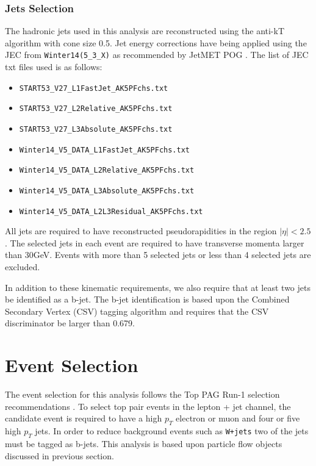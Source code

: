 \subsubsection*{Jets Selection}
The hadronic jets used in this analysis are reconstructed using the anti-kT algorithm with cone size 0.5. Jet energy corrections have being applied using the JEC from \texttt{Winter14(5\_3\_X)} as recommended by JetMET POG \cite{JEC_intro}\cite{JEC_paper}. The list of JEC txt files used is as follows:
\begin{itemize}
\item \texttt{START53\_V27\_L1FastJet\_AK5PFchs.txt}
\item \texttt{START53\_V27\_L2Relative\_AK5PFchs.txt}
\item \texttt{START53\_V27\_L3Absolute\_AK5PFchs.txt}
\item \texttt{Winter14\_V5\_DATA\_L1FastJet\_AK5PFchs.txt}
\item \texttt{Winter14\_V5\_DATA\_L2Relative\_AK5PFchs.txt}
\item \texttt{Winter14\_V5\_DATA\_L3Absolute\_AK5PFchs.txt}
\item \texttt{Winter14\_V5\_DATA\_L2L3Residual\_AK5PFchs.txt}
\end{itemize}  

All jets are required to have reconstructed pseudorapidities in the region $|\eta|<2.5$.  The selected jets in each event are required to have transverse momenta larger than 30GeV. Events with more than 5 selected jets or less than 4 selected jets are excluded. 

In addition to these kinematic requirements, we also require that at least two jets be identified as a b-jet.  The b-jet identification is based upon the Combined Secondary Vertex (CSV) tagging algorithm \cite{CSV_note} and requires that the CSV discriminator be larger than 0.679.

\section{Event Selection}
\label{sec:event_selection}

The event selection for this analysis follows the Top PAG Run-1 selection recommendations \cite{top_selection}.  To select top pair events in the lepton + jet channel, the candidate event is required to have a high $p_T$ electron or muon and four or five high $p_T$ jets.  In order to reduce background events such as \texttt{W+jets} two of the jets must be tagged as b-jets.   This analysis is based upon particle flow objects discussed in previous section. 

